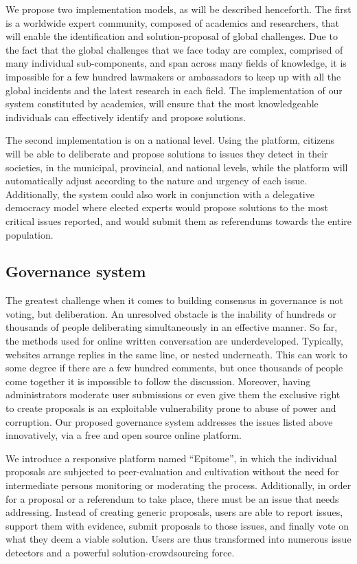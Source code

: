 \documentclass[a4paper,11pt]{article}
\begin{document}
\begin{multicols}{2}
We propose two implementation models, as will be described henceforth. The first is a worldwide expert community, composed of academics and researchers, that will enable the identification and solution-proposal of global challenges. Due to the fact that the global challenges that we face today are complex, comprised of many individual sub-components, and span across many fields of knowledge, it is impossible for a few hundred lawmakers or ambassadors to keep up with all the global incidents and the latest research in each field. The implementation of our system constituted by academics, will ensure that the most knowledgeable individuals can effectively identify and propose solutions.

The second implementation is on a national level. Using the platform, citizens will be able to deliberate and propose solutions to issues they detect in their societies, in the municipal, provincial, and national levels, while the platform will automatically adjust according to the nature and urgency of each issue. Additionally, the system could also work in conjunction with a delegative democracy model where elected experts would propose solutions to the most critical issues reported, and would submit them as referendums towards the entire population.

\subsection{Governance system} \label{governance}

The greatest challenge when it comes to building consensus in governance is not voting, but deliberation. An unresolved obstacle is the inability of hundreds or thousands of people deliberating simultaneously in an effective manner. So far, the methods used for online written conversation are underdeveloped. Typically, websites arrange replies in the same line, or nested underneath. This can work to some degree if there are a few hundred comments, but once thousands of people come together it is impossible to follow the discussion. Moreover, having administrators moderate user submissions or even give them the exclusive right to create proposals is an exploitable vulnerability prone to abuse of power and corruption. Our proposed governance system addresses the issues listed above innovatively, via a free and open source online platform.

We introduce a responsive platform named ``Epitome'', in which the individual proposals are subjected to peer-evaluation and cultivation without the need for intermediate persons monitoring or moderating the process. Additionally, in order for a proposal or a referendum to take place, there must be an issue that needs addressing. Instead of creating generic proposals, users are able to report issues, support them with evidence, submit proposals to those issues, and finally vote on what they deem a viable solution. Users are thus transformed into numerous issue detectors and a powerful solution-crowdsourcing force.


\end{multicols}
\end{document}
